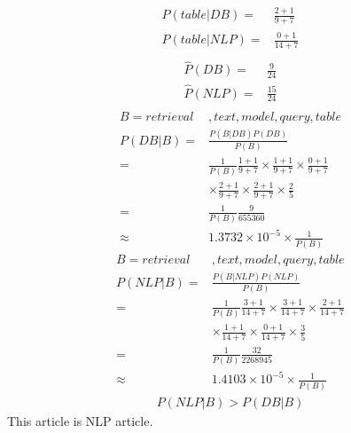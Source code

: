\documentclass{article}
\begin{document}
    \begin{equation}
        \begin{split}
            \hat{P}(table|DB)=&\frac{2+1}{9+7}\\
            \hat{P}(table|NLP)=&\frac{0+1}{14+7}\\
        \end{split}
    \end{equation}
    \begin{equation}
        \begin{split}
            \hat{P}(DB)=&\frac{9}{24}\\
            \hat{P}(NLP)=&\frac{15}{24}\\
        \end{split}
    \end{equation}
    \begin{equation}
        \begin{split}
            B=retrieval&,text,model,query,table\\
            P(DB|B)=&\frac{P(B|DB)P(DB)}{P(B)}\\
                =&\frac{1}{P(B)}\frac{1+1}{9+7}\times\frac{1+1}{9+7}\times\frac{0+1}{9+7}\\
                &\times \frac{2+1}{9+7}\times\frac{2+1}{9+7}\times \frac{2}{5}\\
                =&\frac{1}{P(B)}\frac{9}{655360}\\
                \approx&1.3732\times 10^{-5}\times\frac{1}{P(B)}
        \end{split}
    \end{equation}
    \begin{equation}
        \begin{split}
            B=retrieval&,text,model,query,table\\
            P(NLP|B)=&\frac{P(B|NLP)P(NLP)}{P(B)}\\
                =&\frac{1}{P(B)}\frac{3+1}{14+7} \times\frac{3+1}{14+7} \times\frac{2+1}{14+7}\\
                &\times \frac{1+1}{14+7}\times\frac{0+1}{14+7}\times \frac{3}{5}\\
                =&\frac{1}{P(B)}\frac{32}{2268945}\\
                \approx & 1.4103\times 10^{-5}\times\frac{1}{P(B)}
        \end{split}
    \end{equation}
    \begin{equation}
        \begin{split}
            P(NLP|B)>P(DB|B)
        \end{split}
    \end{equation}
    This article is NLP article.
\end{document}
